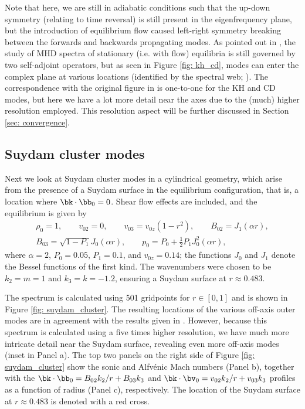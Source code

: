 Note that here, we are still in adiabatic conditions such that the up-down symmetry (relating to time reversal) is still present in the eigenfrequency plane, but the introduction of equilibrium flow caused left-right symmetry breaking between the forwards and backwards propagating modes. As pointed out in \citet{goedbloed2018_web1}, the study of MHD spectra of stationary (i.e. with flow) equilibria is still governed by two self-adjoint operators, but as seen in Figure \ref{fig: kh_cd}, modes can enter the complex plane at various locations (identified by the spectral web; \citet{goedbloed2018_web2}). The correspondence with the original figure in \citet{baty2002} is one-to-one for the KH and CD modes, but here we have a lot more detail near the axes due to the (much) higher resolution employed. This resolution aspect will be further discussed in Section \ref{sec: convergence}.

\subsection{Suydam cluster modes}
Next we look at Suydam cluster modes in a cylindrical geometry, which arise from the presence of a Suydam surface in the equilibrium configuration, that is, a location where $\bk \cdot \bb_0 = 0$. Shear flow effects are included, and the equilibrium is given by
\begin{equation} \label{eq: suydam_equilibrium}
  \begin{gathered}
    \rho_0 = 1,
    \qquad
    v_{02} = 0,
    \qquad
    v_{03} = v_{0z}\left(1 - r^2\right),
    \qquad
    B_{02} = J_1(\alpha r), \\
    B_{03} = \sqrt{1 - P_1}J_0(\alpha r),
    \qquad
    p_0 = P_0 + \frac{1}{2}P_1 J_0^2(\alpha r),
  \end{gathered}
\end{equation}
where $\alpha = 2$, $P_0 = 0.05$, $P_1 = 0.1$, and $v_{0z} = 0.14$; the functions $J_0$ and $J_1$ denote the Bessel functions of the first kind. The wavenumbers were chosen to be $k_2 = m = 1$ and $k_3 = k = -1.2$, ensuring a Suydam surface at $r \approx 0.483$.

The spectrum is calculated using 501 gridpoints for $r \in [0, 1]$ and is shown in Figure \ref{fig: suydam_cluster}. The resulting locations of the various off-axis outer modes are in agreement with the results given in \citet{nijboer1997}. However, because this spectrum is calculated using a five times higher resolution, we have much more intricate detail near the Suydam surface, revealing even more off-axis modes (inset in Panel a). The top two panels on the right side of Figure \ref{fig: suydam_cluster} show the sonic and Alfv\'enic Mach numbers (Panel b), together with the $\bk \cdot \bb_0 = B_{02}k_2/r + B_{03}k_3$ and $\bk \cdot \bv_0 = v_{02}k_2/r + v_{03}k_3$ profiles as a function of radius (Panel c), respectively. The location of the Suydam surface at $r \approx 0.483$ is denoted with a red cross.

